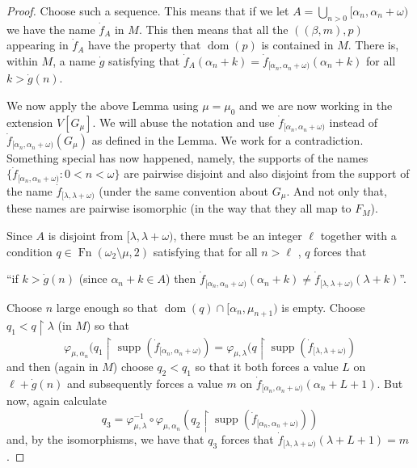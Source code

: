 \documentclass{amsart}
\theoremstyle{plain}
\theoremstyle{definition}
\theoremstyle{remark}
\theoremstyle{plain}
\theoremstyle{definition}
\theoremstyle{remark}
\begin{document}
\begin{proof}
            Choose such a sequence.
             This means that if we let $A = \bigcup_{n>0} [\alpha_n,\alpha_n+\omega)$ we
             have the name $\dot f_A$ in $M$. This then means that all
             the $( (\beta,m) , p)$ appearing in $\dot f_A$ have the property
             that $\mathop{dom}(p)$ is contained in $M$.
            There is, within $M$, a name $\dot g$ satisfying that
             $\dot f_A(\alpha_n+k) = \dot f_{[\alpha_n,\alpha_n+\omega)}(\alpha_n+k)$
            for all $k >\dot g(n)$.

            \bigskip

            We now apply the above Lemma using $\mu = \mu_0$ and we are now
            working in the extension $V[G_\mu]$. We will abuse the notation
            and use $\dot f_{[\alpha_n,\alpha_n+\omega)}$ instead of
              $\dot f_{[\alpha_n,\alpha_n+\omega)}(G_{\mu})$ as defined in
              the Lemma.
            We work for a contradiction. Something special has now happened,
             namely,  the supports of the names $\{
            \dot f_{[\alpha_n, \alpha_n+\omega)} :  0< n<\omega\}$ are pairwise disjoint
            and also disjoint from the support of the name
             $\dot f_{[\lambda,\lambda+\omega)}$ (under the same convention about
             $G_\mu$.  And not only that, these names are pairwise isomorphic (in
             the way that they all map to $F_M$).


            \bigskip

            Since $A$ is disjoint from $[\lambda,\lambda+\omega)$,
            there must be an integer $\ell$
            together with a condition
             $q\in \mathop{Fn}(\omega_2\setminus \mu,2)$ satisfying that for all
             $n>\ell$ , $q$ forces that

            \centerline{
             ``if $k>\dot g(n)$ (since  $\alpha_n+k\in A$) then
             $\dot f_{[\alpha_n,\alpha_n+\omega)}(\alpha_n+k) \neq
            \dot f_{[\lambda,\lambda+\omega)}(\lambda +k)$''.}

            Choose $n$ large enough so that $\mathop{dom}(q) \cap [\alpha_n,
            \mu_{n+1})$ is
            empty.
             Choose $q_1<q\restriction \lambda$ (in $M$) so that
            $$ \varphi_{\mu,\alpha_n}(q_1\restriction \operatorname{supp}(
             \dot f_{[\alpha_n,\alpha_n+\omega)}) =
            \varphi_{\mu,\lambda}(q\restriction \operatorname{supp}(
             \dot f_{[\lambda,\lambda+\omega)}) $$
            and then (again in $M$) choose $q_2 < q_1$
            so that it both forces a value
             $L$ on $\ell+\dot g(n)$
            and subsequently forces a value $m$ on
             $\dot f_{[\alpha_n, \alpha_n+\omega)}(\alpha_n+L+1)$.
            But now, again calculate
            $$ q_3 = \varphi_{\mu,\lambda}^{-1} \circ \varphi_{\mu,\alpha_n}
            (q_2\restriction \operatorname{supp}(\dot
            f_{[\alpha_n,\alpha_n+\omega)}))$$
            and, by the isomorphisms, we have that $q_3$ forces that
             $\dot f_{[\lambda,\lambda+\omega)}(\lambda+L+1) = m$.


\end{proof}
\end{document}
